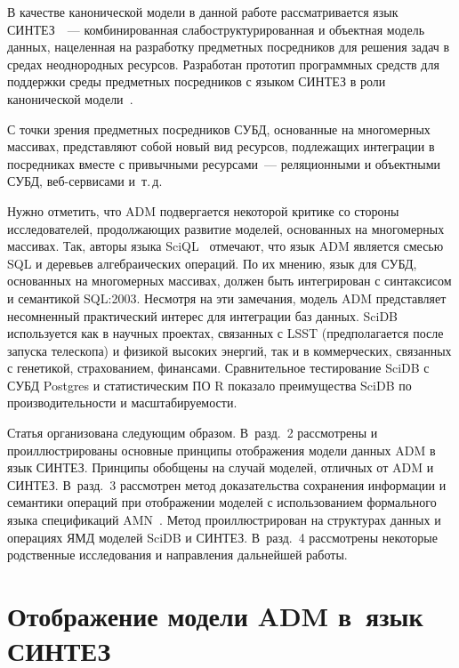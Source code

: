 \begin{multicols}{2}
        В качестве канонической модели в данной работе рассматривается язык 
СИНТЕЗ~\cite{13-stu}~--- комбинированная слабоструктурированная и 
объектная модель данных, нацеленная на разработку предметных посредников 
для решения задач в средах неоднородных ресурсов. Разработан прототип 
программных средств для поддержки среды предметных посредников с языком 
СИНТЕЗ в роли канонической модели~\cite{14-stu}.
        
        С точки зрения предметных посредников СУБД, основанные на 
многомерных массивах, пред\-став\-ля\-ют собой новый вид ресурсов, подлежащих 
интеграции в посредниках вместе с привычными ресурсами~--- реляционными 
и объектными СУБД, веб-сер\-ви\-са\-ми и~т.\,д. 
        
        Нужно отметить, что ADM подвергается некоторой критике со стороны 
исследователей, продолжающих развитие моделей, основанных на 
многомерных массивах. Так, авторы языка SciQL~\cite{15-stu} отмечают, что 
язык ADM является смесью SQL и деревьев алгебраических операций. По их 
мнению, язык для СУБД, основанных на многомерных массивах, должен быть 
интегрирован с синтаксисом и семантикой SQL:2003. Несмотря на эти 
замечания, модель ADM представляет несомненный практический интерес для 
интеграции баз данных. SciDB используется как в научных проектах, связанных 
с LSST (предполагается после запуска телескопа) и физикой высоких энергий, 
так и в коммерческих, связанных с генетикой, страхованием, финансами. 
Сравнительное тестирование SciDB с СУБД Postgres и статистическим ПО R 
показало преимущества SciDB по производительности и масштабируемости.
        
        Статья организована следующим образом. В~разд.~2 рассмотрены и 
проиллюстрированы основные принципы отобра\-же\-ния модели данных ADM в 
язык СИНТЕЗ. Принципы обобщены на случай моделей, отличных от ADM и 
СИНТЕЗ. В~разд.~3 рассмотрен метод доказательства сохранения информации 
и семантики операций при отоб\-ра\-же\-нии моделей с использованием 
формального языка спецификаций AMN~\cite{16-stu}. Метод 
проиллюстрирован на структурах данных и операциях ЯМД моделей SciDB и 
СИНТЕЗ. В~разд.~4 рассмотрены некоторые родственные исследования и 
направления дальнейшей работы.

\vspace*{6pt}

\section{Отображение модели ADM в~язык СИНТЕЗ}


\end{multicols}
